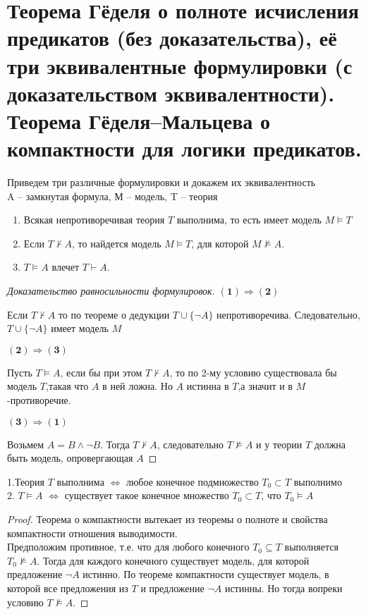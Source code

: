 \section{Теорема Гёделя о полноте исчисления предикатов (без доказательства), её
три эквивалентные формулировки (с доказательством эквивалентности).\\
Теорема Гёделя–Мальцева о компактности для логики предикатов.}
\begin{theorem}
    Приведем три различные формулировки и докажем их эквивалентность\\
    A -- замкнутая формула, М -- модель, T -- теория
	\begin{enumerate}
		\item Всякая непротиворечивая теория $T$ выполнима, то есть имеет модель $M\models T$
		\item Если $ T \nvdash A$, то найдется модель $M\models T$, для которой $M \nvDash A$.
		\item $T\models A$ влечет $T \vdash A$.
	\end{enumerate}
\end{theorem}
\begin{proof}[Доказательство равносильности формулировок]
    $\boldsymbol{(1)}\Rightarrow \boldsymbol{(2)}$
    
	Если $T\nvdash A$ то по теореме о дедукции ${T} \cup \{\neg A\}$ непротиворечива.
    Следовательно, \\$T \cup \{\neg A\}$ имеет модель $M$
    
    $\boldsymbol{(2)}\Rightarrow \boldsymbol{(3)}$

	Пусть $T\vDash A$, если бы при этом $T \nvdash A$, то по 2-му условию существовала
	бы модель $T$,такая что $A$ в ней ложна. Но $A$ истинна в $T$,а значит и в $M$-противоречие.

    $\boldsymbol{(3)}\Rightarrow \boldsymbol{(1)}$

	Возьмем $A = B \wedge \neg B$. Тогда $T\nvdash A$, следовательно $T \nvDash A$ и у теории $T$ должна быть
	модель, опровергающая $A$
\end{proof}
\begin{theorem}
	1.Теория $T$ выполнима $ \Longleftrightarrow$ любое конечное подмножество
	$T_0\subset T$ выполнимо\\
	2. $T\models A$   $ \Longleftrightarrow$ существует такое конечное множество
	$T_0\subset T$, что $T_0\models A$  
\end{theorem}
\begin{proof}
Теорема о компактности вытекает из теоремы о полноте и свойства компактности отношения выводимости.\\
Предположим противное, т.е. что для любого конечного $T_0\subseteq T$ выполняется
$T_0\nvDash A$. Тогда для каждого конечного существует модель, для которой предложение
$\neg A$  истинно. По теореме компактности существует модель, в которой все предложения из
$T$ и предложение $\neg A$ истинны. Но тогда вопреки условию $T\nvDash A$.
\end{proof}
